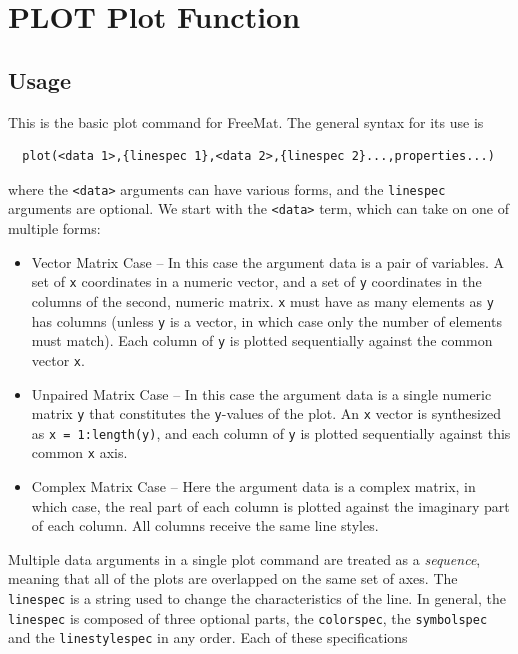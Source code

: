 \section{PLOT Plot Function}

\subsection{Usage}

This is the basic plot command for FreeMat.  The general syntax for its
use is
\begin{verbatim}
  plot(<data 1>,{linespec 1},<data 2>,{linespec 2}...,properties...)
\end{verbatim}
where the \verb|<data>| arguments can have various forms, and the
\verb|linespec| arguments are optional.  We start with the
\verb|<data>| term, which can take on one of multiple forms:
\begin{itemize}
\item  Vector Matrix Case -- In this case the argument data is a pair
    of variables.  A set of \verb|x| coordinates in a numeric vector, and a 
    set of \verb|y| coordinates in the columns of the second, numeric matrix.
    \verb|x| must have as many elements as \verb|y| has columns (unless \verb|y|
    is a vector, in which case only the number of elements must match).  Each
    column of \verb|y| is plotted sequentially against the common vector \verb|x|.

\item  Unpaired Matrix Case -- In this case the argument data is a 
    single numeric matrix \verb|y| that constitutes the \verb|y|-values
    of the plot.  An \verb|x| vector is synthesized as \verb|x = 1:length(y)|,
    and each column of \verb|y| is plotted sequentially against this common \verb|x|
    axis.

\item  Complex Matrix Case -- Here the argument data is a complex
    matrix, in which case, the real part of each column is plotted against
    the imaginary part of each column.  All columns receive the same line
    styles.

\end{itemize}
Multiple data arguments in a single plot command are treated as a \emph{sequence}, meaning
that all of the plots are overlapped on the same set of axes.
The \verb|linespec| is a string used to change the characteristics of the line.  In general,
the \verb|linespec| is composed of three optional parts, the \verb|colorspec|, the 
\verb|symbolspec| and the \verb|linestylespec| in any order.  Each of these specifications
